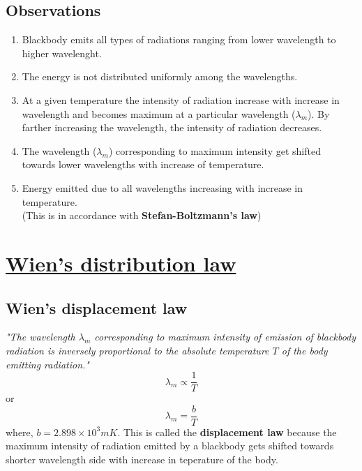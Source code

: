 \documentclass[14pt,a4paper]{article}
\begin{document}
\subsection{\textbf{Observations}}
\begin{enumerate}
    \item Blackbody emits all types of radiations ranging from lower wavelength to higher wavelenght.
    \item The energy is not distributed uniformly among the wavelengths.
    \item At a given temperature the intensity of radiation increase with increase in wavelength and becomes maximum at a particular wavelength ($\lambda_{m}$). By farther increasing the wavelength, the intensity of radiation decreases.
    \item The wavelength ($\lambda_{m}$) corresponding to maximum intensity get shifted towards lower wavelengths with increase of temperature.
    \item Energy emitted due to all wavelengths increasing with increase in temperature.\\
    (This is in accordance with \textbf{Stefan-Boltzmann's law})
\end{enumerate}
\newpage
\section{\underline{Wien's distribution law}}
    \subsection{\textbf{Wien's displacement law}} \textit{"The wavelength $\lambda_{m}$ corresponding to maximum intensity of emission of blackbody radiation is inversely proportional to the absolute temperature $T$ of the body emitting radiation."}
    \begin{equation*}
        \lambda_{m} \propto \frac{1}{T}
    \end{equation*}
    or
    \begin{equation}
        \lambda_{m} = \frac{b}{T}
    \end{equation}
    where,  $b = 2.898 \times 10^{3} mK$.
This is called the \textbf{displacement law} because the maximum intensity of radiation emitted by a blackbody gets shifted towards shorter wavelength side with increase in teperature of the body.
\end{document}
